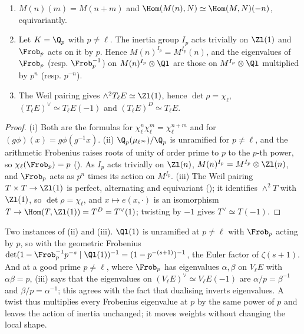 \begin{proposition}[twists]\label{prop:blochkato:twists}
\begin{enumerate}[label=(\roman*)]
\item \sloppy $M(n)(m)=M(n+m)$ and $\Hom(M(n),N)\simeq\Hom(M,N)(-n)$, equivariantly.
\item Let $K=\Q_p$ with $p\ne\ell$. The inertia group $I_p$ acts trivially on $\Zl(1)$ and $\Frob_p$ acts on it by $p$. Hence $M(n)^{I_p}=M^{I_p}(n)$, and the
eigenvalues of $\Frob_p$ (resp. $\Frob_p^{-1}$) on $M(n)^{I_p}\otimes\Ql$ are those on $M^{I_p}\otimes\Ql$ multiplied by $p^n$ (resp. $p^{-n}$).
\item The Weil pairing gives $\wedge^2T_\ell E\simeq\Zl(1)$, hence $\det\rho=\chi_\ell$, $(T_\ell E)^\vee\simeq T_\ell E(-1)$ and $(T_\ell E)^D\simeq T_\ell E$.
\end{enumerate}
\end{proposition}

\begin{proof}
(i) Both are the formulas for $\chi_\ell^n\chi_\ell^m=\chi_\ell^{n+m}$ and for $(g\phi)(x)=g\phi(g^{-1}x)$. (ii) $\Q_p(\mu_{\ell^\infty})/\Q_p$ is unramified for $p\ne\ell$, and the
arithmetic Frobenius raises roots of unity of order prime to $p$ to the $p$-th power, so $\chi_\ell(\Frob_p)=p$ (). As $I_p$ acts trivially on
$\Zl(n)$, $M(n)^{I_p}=M^{I_p}\otimes\Zl(n)$, and $\Frob_p$ acts as $p^n$ times its action on $M^{I_p}$. (iii) The Weil pairing $T\times T\to\Zl(1)$ is perfect,
alternating and equivariant (); it identifies $\wedge^2T$ with $\Zl(1)$, so $\det\rho=\chi_\ell$, and $x\mapsto e(x,\cdot)$ is an isomorphism
$T\to\Hom(T,\Zl(1))=T^D=T^\vee(1)$; twisting by $-1$ gives $T^\vee\simeq T(-1)$.
\end{proof}

Two instances of (ii) and (iii). $\Ql(1)$ is unramified at $p\ne\ell$ with $\Frob_p$ acting by $p$, so with the geometric Frobenius
$\det(1-\Frob_p^{-1}p^{-s}\mid\Ql(1))^{-1}=(1-p^{-(s+1)})^{-1}$, the Euler factor of $\zeta(s+1)$. And at a good prime $p\ne\ell$, where $\Frob_p$ has eigenvalues $\alpha,\beta$ on
$V_\ell E$ with $\alpha\beta=p$, (iii) says that the eigenvalues on $(V_\ell E)^\vee\simeq V_\ell E(-1)$ are $\alpha/p=\beta^{-1}$ and $\beta/p=\alpha^{-1}$; this agrees with the fact that
dualising inverts eigenvalues. A twist thus multiplies every Frobenius eigenvalue at $p$ by the same power of $p$ and leaves the action of inertia unchanged; it
moves weights without changing the local shape.

